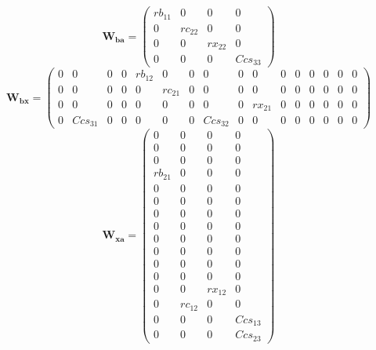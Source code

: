 \[ \mathbf{W_{ba}} = \left(\begin{smallmatrix} rb_{11} & 0 & 0 & 0 \\
0 & rc_{22} & 0 & 0 \\ 0 & 0 & rx_{22} & 0 \\ 0 & 0 & 0 & Ccs_{33}
\end{smallmatrix}\right) \]
\[ \mathbf{W_{bx}} = \left(\begin{smallmatrix} 0 & 0 & 0 & 0 & rb_{12}
& 0 & 0 & 0 & 0 & 0 & 0 & 0 & 0 & 0 & 0 & 0 \\ 0 & 0 & 0 & 0 & 0 &
rc_{21} & 0 & 0 & 0 & 0 & 0 & 0 & 0 & 0 & 0 & 0 \\ 0 & 0 & 0 & 0 & 0 &
0 & 0 & 0 & 0 & rx_{21} & 0 & 0 & 0 & 0 & 0 & 0 \\ 0 & Ccs_{31} & 0 &
0 & 0 & 0 & 0 & Ccs_{32} & 0 & 0 & 0 & 0 & 0 & 0 & 0 & 0
\end{smallmatrix}\right) \]
\[ \mathbf{W_{xa}} = \left(\begin{smallmatrix} 0 & 0 & 0 & 0 \\ 0 & 0
& 0 & 0 \\ 0 & 0 & 0 & 0 \\ rb_{21} & 0 & 0 & 0 \\ 0 & 0 & 0 & 0 \\ 0
& 0 & 0 & 0 \\ 0 & 0 & 0 & 0 \\ 0 & 0 & 0 & 0 \\ 0 & 0 & 0 & 0 \\ 0 &
0 & 0 & 0 \\ 0 & 0 & 0 & 0 \\ 0 & 0 & 0 & 0 \\ 0 & 0 & rx_{12} & 0 \\
0 & rc_{12} & 0 & 0 \\ 0 & 0 & 0 & Ccs_{13} \\ 0 & 0 & 0 & Ccs_{23}
\end{smallmatrix}\right) \]
